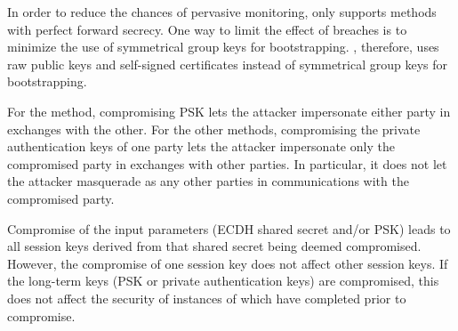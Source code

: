 In order to reduce the chances of pervasive monitoring, \mEdhoc only supports methods with perfect forward secrecy. One way to limit the effect of breaches is to minimize the use of symmetrical group keys for bootstrapping. \mEdhoc, therefore, uses raw public keys and self-signed certificates instead of symmetrical group keys for bootstrapping.

For the \mPskPsk method, compromising PSK lets the attacker impersonate either party in \mEdhoc exchanges with the other. For the other methods, compromising the private authentication keys of one party lets the attacker impersonate only the compromised party in exchanges with other parties. In particular, it does not let the attacker masquerade as any other parties in communications with the compromised party. 

Compromise of the \mHkdf input parameters (ECDH shared secret and/or PSK) leads to all session keys derived from that shared secret being deemed compromised. However, the compromise of one session key does not affect other session keys. If the long-term keys (PSK or private authentication keys) are compromised, this does not affect the security of instances of \mEdhoc which have completed prior to compromise. 

